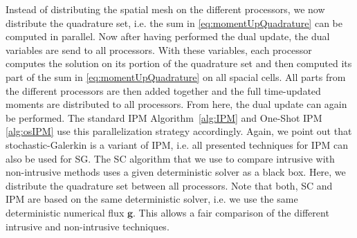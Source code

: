 Instead of distributing the spatial mesh on the different processors, we now distribute the quadrature set, i.e. the sum in \eqref{eq:momentUpQuadrature} can be computed in parallel. Now after having performed the dual update, the dual variables are send to all processors. With these variables, each processor computes the solution on its portion of the quadrature set and then computed its part of the sum in \eqref{eq:momentUpQuadrature} on all spacial cells. All parts from the different processors are then added together and the full time-updated moments are distributed to all processors. From here, the dual update can again be performed. The standard IPM Algorithm~\ref{alg:IPM} and One-Shot IPM \ref{alg:osIPM} use this parallelization strategy accordingly. Again, we point out that stochastic-Galerkin is a variant of IPM, i.e. all presented techniques for IPM can also be used for SG. The SC algorithm that we use to compare intrusive with non-intrusive methods uses a given deterministic solver as a black box. Here, we distribute the quadrature set between all processors. Note that both, SC and IPM are based on the same deterministic solver, i.e. we use the same deterministic numerical flux $\bm g$. This allows a fair comparison of the different intrusive and non-intrusive techniques.

